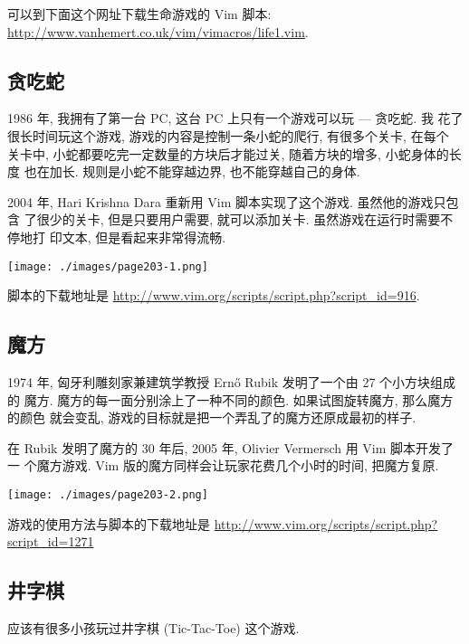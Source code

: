 可以到下面这个网址下载生命游戏的 Vim 脚本:
\url{http://www.vanhemert.co.uk/vim/vimacros/life1.vim}.

\subsection{贪吃蛇}
\label{subsec:nibbles}

1986 年, 我拥有了第一台 PC, 这台 PC 上只有一个游戏可以玩 --- 贪吃蛇. 我
花了很长时间玩这个游戏, 游戏的内容是控制一条小蛇的爬行, 有很多个关卡, 在每个
关卡中, 小蛇都要吃完一定数量的方块后才能过关, 随着方块的增多, 小蛇身体的长度
也在加长. 规则是小蛇不能穿越边界, 也不能穿越自己的身体.

2004 年, Hari Krishna Dara 重新用 Vim 脚本实现了这个游戏. 虽然他的游戏只包含
了很少的关卡, 但是只要用户需要, 就可以添加关卡. 虽然游戏在运行时需要不停地打
印文本, 但是看起来非常得流畅.

\begin{center}
    \texttt{[image: ./images/page203-1.png]}
\end{center}

脚本的下载地址是 \url{http://www.vim.org/scripts/script.php?script_id=916}.

\subsection{魔方}
\label{subsec:rubik_s_cube}

1974 年, 匈牙利雕刻家兼建筑学教授 Ern\H{o} Rubik 发明了一个由 27 个小方块组成的
魔方. 魔方的每一面分别涂上了一种不同的颜色. 如果试图旋转魔方, 那么魔方的颜色
就会变乱, 游戏的目标就是把一个弄乱了的魔方还原成最初的样子.

在 Rubik 发明了魔方的 30 年后, 2005 年, Olivier Vermersch 用 Vim 脚本开发了一
个魔方游戏. Vim 版的魔方同样会让玩家花费几个小时的时间, 把魔方复原.

\begin{center}
    \texttt{[image: ./images/page203-2.png]}
\end{center}

游戏的使用方法与脚本的下载地址是
\url{http://www.vim.org/scripts/script.php?script_id=1271}

\subsection{井字棋}
\label{subsec:tic_tac_toe}
应该有很多小孩玩过井字棋 (Tic-Tac-Toe) 这个游戏.

